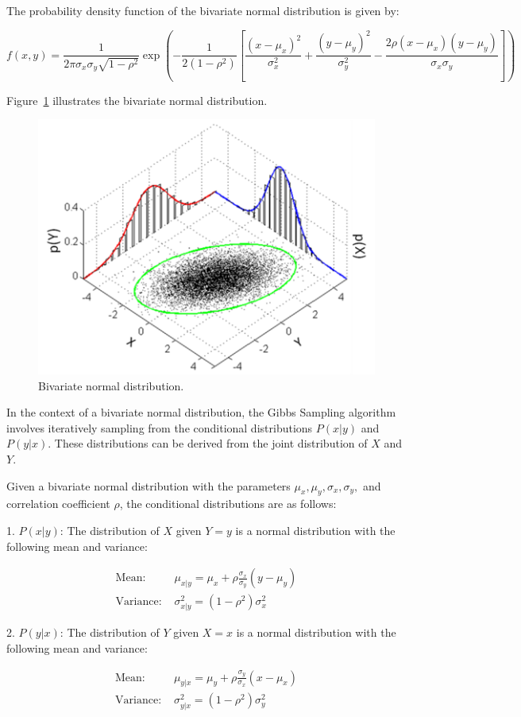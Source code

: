 \documentclass{report}
\begin{document}
The probability density function of the bivariate normal distribution is given by:

\[
	f(x,y) = \frac{1}{2 \pi \sigma_x \sigma_y \sqrt{1 - \rho^2}} \exp \left( -\frac{1}{2(1 - \rho^2)} \left[ \frac{(x - \mu_x)^2}{\sigma_x^2} + \frac{(y - \mu_y)^2}{\sigma_y^2} - \frac{2 \rho (x - \mu_x)(y - \mu_y)}{\sigma_x \sigma_y} \right] \right)
\]

Figure~\ref{fig:bivariatenormal} illustrates the bivariate normal distribution.

\begin{figure}[H]
	\centering
	\includegraphics[width=0.5\linewidth]{./Figures/MCMC/MultivariateNormal-2.png}
	\caption{Bivariate normal distribution.}
	\label{fig:bivariatenormal}
\end{figure}

In the context of a bivariate normal distribution, the Gibbs Sampling algorithm involves iteratively sampling from the conditional distributions \( P(x | y) \) and \( P(y | x) \). These distributions can be derived from the joint distribution of \( X \) and \( Y \).

Given a bivariate normal distribution with the parameters \( \mu_x, \mu_y, \sigma_x, \sigma_y, \) and correlation coefficient \( \rho \), the conditional distributions are as follows:

1. \( P(x | y) \): The distribution of \( X \) given \( Y = y \) is a normal distribution with the following mean and variance:
   
\begin{align*}
   	\text{Mean: } & \mu_{x|y} = \mu_x + \rho \frac{\sigma_x}{\sigma_y}(y - \mu_y) \\
	\text{Variance: } & \sigma_{x|y}^2 = (1 - \rho^2)\sigma_x^2
\end{align*}

2. \( P(y | x) \): The distribution of \( Y \) given \( X = x \) is a normal distribution with the following mean and variance:

\begin{align*}
   \text{Mean: } & \mu_{y|x} = \mu_y + \rho \frac{\sigma_y}{\sigma_x}(x - \mu_x) \\
   \text{Variance: } & \sigma_{y|x}^2 = (1 - \rho^2)\sigma_y^2
\end{align*}
\end{document}
